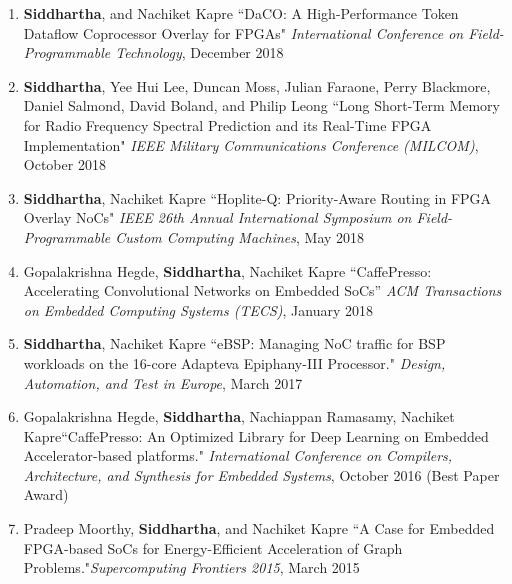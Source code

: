 \documentclass[10pt]{article}
\begin{document}
\begin{enumerate}
    \item {\bf Siddhartha}, and Nachiket Kapre ``DaCO: A High-Performance Token Dataflow Coprocessor Overlay for FPGAs" \emph{International Conference on Field-Programmable Technology}, December 2018
    \item {\bf Siddhartha}, Yee Hui Lee, Duncan Moss, Julian Faraone, Perry Blackmore, Daniel Salmond, David Boland, and Philip Leong ``Long Short-Term Memory for Radio Frequency Spectral Prediction and its Real-Time FPGA Implementation" \emph{IEEE Military Communications Conference (MILCOM)}, October 2018
    \item {\bf Siddhartha}, Nachiket Kapre ``Hoplite-Q: Priority-Aware Routing in FPGA Overlay NoCs" \emph{IEEE 26th Annual International Symposium on Field-Programmable Custom Computing Machines}, May 2018
    \item Gopalakrishna Hegde, {\bf Siddhartha}, Nachiket Kapre ``CaffePresso: Accelerating Convolutional Networks on Embedded SoCs'' \emph{ACM Transactions on Embedded Computing Systems (TECS)}, January 2018
    \item {\bf Siddhartha}, Nachiket Kapre ``eBSP: Managing NoC traffic for BSP workloads on the 16-core Adapteva Epiphany-III Processor." \emph{Design, Automation, and Test in Europe}, March 2017
    \item Gopalakrishna Hegde, \textbf{Siddhartha}, Nachiappan Ramasamy, Nachiket Kapre\newline``CaffePresso: An Optimized Library for Deep Learning on Embedded Accelerator-based platforms." \emph{International Conference on Compilers, Architecture, and Synthesis for Embedded Systems}, October 2016 (Best Paper Award)
    \item Pradeep Moorthy, {\bf Siddhartha}, and Nachiket Kapre ``A Case for Embedded FPGA-based SoCs for Energy-Efficient Acceleration of Graph Problems."\newline\emph{Supercomputing Frontiers 2015}, March 2015
\end{enumerate}
\end{document}

